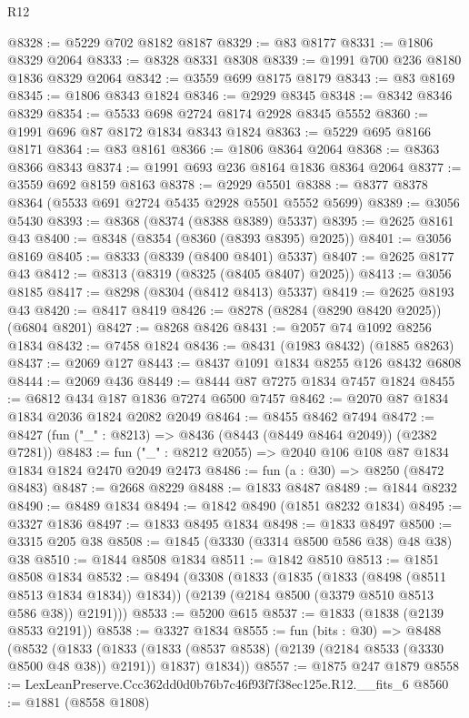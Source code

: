 \begin{lexlean}{R12}
\begin{coremodule}
@8328 := @5229 @702 @8182 @8187
@8329 := @83 @8177
@8331 := @1806 @8329 @2064
@8333 := @8328 @8331 @8308
@8339 := @1991 @700 @236 @8180 @1836 @8329 @2064
@8342 := @3559 @699 @8175 @8179
@8343 := @83 @8169
@8345 := @1806 @8343 @1824
@8346 := @2929 @8345
@8348 := @8342 @8346 @8329
@8354 := @5533 @698 @2724 @8174 @2928 @8345 @5552
@8360 := @1991 @696 @87 @8172 @1834 @8343 @1824
@8363 := @5229 @695 @8166 @8171
@8364 := @83 @8161
@8366 := @1806 @8364 @2064
@8368 := @8363 @8366 @8343
@8374 := @1991 @693 @236 @8164 @1836 @8364 @2064
@8377 := @3559 @692 @8159 @8163
@8378 := @2929 @5501
@8388 := @8377 @8378 @8364 (@5533 @691 @2724 @5435 @2928 @5501 @5552 @5699)
@8389 := @3056 @5430
@8393 := @8368 (@8374 (@8388 @8389) @5337)
@8395 := @2625 @8161 @43
@8400 := @8348 (@8354 (@8360 (@8393 @8395) @2025))
@8401 := @3056 @8169
@8405 := @8333 (@8339 (@8400 @8401) @5337)
@8407 := @2625 @8177 @43
@8412 := @8313 (@8319 (@8325 (@8405 @8407) @2025))
@8413 := @3056 @8185
@8417 := @8298 (@8304 (@8412 @8413) @5337)
@8419 := @2625 @8193 @43
@8420 := @8417 @8419
@8426 := @8278 (@8284 (@8290 @8420 @2025)) (@6804 @8201)
@8427 := @8268 @8426
@8431 := @2057 @74 @1092 @8256 @1834
@8432 := @7458 @1824
@8436 := @8431 (@1983 @8432) (@1885 @8263)
@8437 := @2069 @127
@8443 := @8437 @1091 @1834 @8255 @126 @8432 @6808
@8444 := @2069 @436
@8449 := @8444 @87 @7275 @1834 @7457 @1824
@8455 := @6812 @434 @187 @1836 @7274 @6500 @7457
@8462 := @2070 @87 @1834 @1834 @2036 @1824 @2082 @2049
@8464 := @8455 @8462 @7494
@8472 := @8427 (fun ("_" : @8213) => @8436 (@8443 (@8449 @8464 @2049)) (@2382 @7281))
@8483 := fun ("_" : @8212 @2055) => @2040 @106 @108 @87 @1834 @1834 @1824 @2470 @2049 @2473
@8486 := fun (a : @30) => @8250 (@8472 @8483)
@8487 := @2668 @8229
@8488 := @1833 @8487
@8489 := @1844 @8232
@8490 := @8489 @1834
@8494 := @1842 @8490 (@1851 @8232 @1834)
@8495 := @3327 @1836
@8497 := @1833 @8495 @1834
@8498 := @1833 @8497
@8500 := @3315 @205 @38
@8508 := @1845 (@3330 (@3314 @8500 @586 @38) @48 @38) @38
@8510 := @1844 @8508 @1834
@8511 := @1842 @8510
@8513 := @1851 @8508 @1834
@8532 := @8494
    (@3308
      (@1833
        (@1835 (@1833 (@8498 (@8511 @8513 @1834 @1834)) @1834))
        (@2139 (@2184 @8500 (@3379 @8510 @8513 @586 @38)) @2191)))
@8533 := @5200 @615
@8537 := @1833 (@1838 (@2139 @8533 @2191))
@8538 := @3327 @1834
@8555 := fun (bits : @30) =>
  @8488
    (@8532
      (@1833
        (@1833 (@1833 (@8537 @8538) (@2139 (@2184 @8533 (@3330 @8500 @48 @38)) @2191)) @1837)
        @1834))
@8557 := @1875 @247 @1879
@8558 := LexLeanPreserve.Ccc362dd0d0b76b7c46f93f7f38ec125e.R12.__fits_6
@8560 := @1881 (@8558 @1808)

\end{coremodule}
\end{lexlean}

